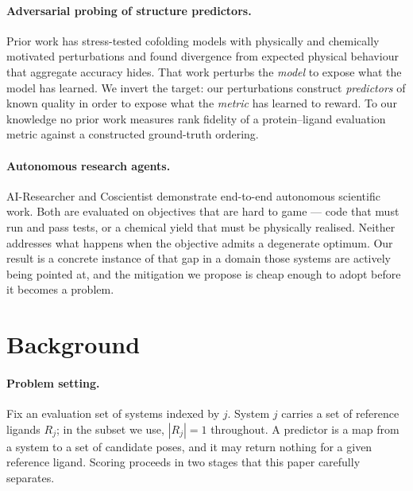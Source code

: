 \documentclass{article} %
\begin{document}
\paragraph{Adversarial probing of structure predictors.} Prior work has stress-tested
cofolding models with physically and chemically motivated perturbations and found
divergence from expected physical behaviour that aggregate accuracy hides. That work
perturbs the \emph{model} to expose what the model has learned. We invert the target:
our perturbations construct \emph{predictors} of known quality in order to expose what
the \emph{metric} has learned to reward. To our knowledge no prior work measures rank
fidelity of a protein--ligand evaluation metric against a constructed ground-truth
ordering.

\paragraph{Autonomous research agents.} AI-Researcher \citep{tang-2025-researcher} and
Coscientist \citep{boiko-2023-autonomous} demonstrate end-to-end autonomous scientific work.
Both are evaluated on objectives that are hard to game --- code that must run and pass
tests, or a chemical yield that must be physically realised. Neither addresses what
happens when the objective admits a degenerate optimum. Our result is a concrete
instance of that gap in a domain those systems are actively being pointed at, and the
mitigation we propose is cheap enough to adopt before it becomes a problem.

\section{Background}
\label{sec:background}
\paragraph{Problem setting.} Fix an evaluation set of systems indexed by $j$. System $j$
carries a set of reference ligands $R_j$; in the subset we use, $|R_j| = 1$ throughout.
A predictor is a map from a system to a set of candidate poses, and it may return
nothing for a given reference ligand. Scoring proceeds in two stages that this paper
carefully separates.
\end{document}
